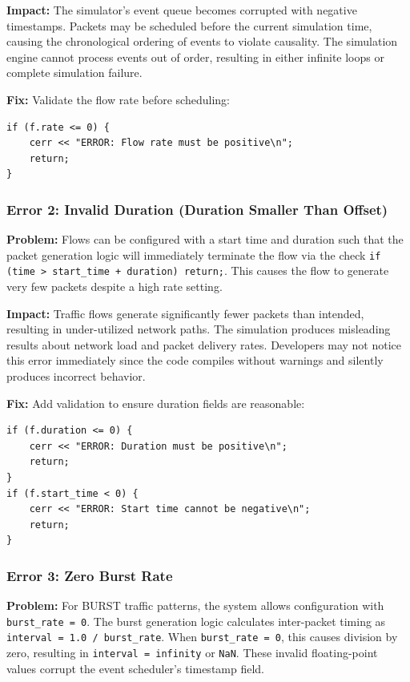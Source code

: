 \documentclass[11pt,a4paper]{article}
\begin{document}
\textbf{Impact:}
The simulator's event queue becomes corrupted with negative timestamps. Packets may be scheduled before the current simulation time, causing the chronological ordering of events to violate causality. The simulation engine cannot process events out of order, resulting in either infinite loops or complete simulation failure.

\textbf{Fix:}
Validate the flow rate before scheduling:
\begin{lstlisting}
if (f.rate <= 0) {
    cerr << "ERROR: Flow rate must be positive\n";
    return;
}
\end{lstlisting}

\vspace{0.5cm}

\subsubsection{Error 2: Invalid Duration (Duration Smaller Than Offset)}

\textbf{Problem:}
Flows can be configured with a start time and duration such that the packet generation logic will immediately terminate the flow via the check \texttt{if (time > start\_time + duration) return;}. This causes the flow to generate very few packets despite a high rate setting.

\textbf{Impact:}
Traffic flows generate significantly fewer packets than intended, resulting in under-utilized network paths. The simulation produces misleading results about network load and packet delivery rates. Developers may not notice this error immediately since the code compiles without warnings and silently produces incorrect behavior.

\textbf{Fix:}
Add validation to ensure duration fields are reasonable:
\begin{lstlisting}
if (f.duration <= 0) {
    cerr << "ERROR: Duration must be positive\n";
    return;
}
if (f.start_time < 0) {
    cerr << "ERROR: Start time cannot be negative\n";
    return;
}
\end{lstlisting}

\vspace{0.5cm}

\subsubsection{Error 3: Zero Burst Rate}

\textbf{Problem:}
For BURST traffic patterns, the system allows configuration with \texttt{burst\_rate = 0}. The burst generation logic calculates inter-packet timing as \texttt{interval = 1.0 / burst\_rate}. When \texttt{burst\_rate = 0}, this causes division by zero, resulting in \texttt{interval = infinity} or \texttt{NaN}. These invalid floating-point values corrupt the event scheduler's timestamp field.
\end{document}
